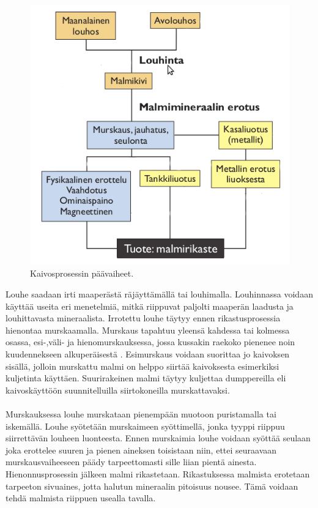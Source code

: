 \documentclass[finnish,12pt,a4paper,pdftex,elec,utf8]{aaltothesis}
\begin{document}
\begin{figure}[H]
	\begin{center}
	\includegraphics[scale=0.8]{Kaivosprosessi}
	\end{center}
	\caption{Kaivosprosessin päävaiheet.
		\cite{Kaivosprosessi}}
	\label{fig:Kaivosprosessi}
	
\end{figure}
\noindent
Louhe saadaan irti maaperästä räjäyttämällä tai louhimalla. Louhinnassa voidaan käyttää useita eri menetelmiä, mitkä riippuvat paljolti maaperän laadusta ja louhittavasta mineraalista. Irrotettu louhe täytyy ennen rikastusprosessia hienontaa murskaamalla. Murskaus tapahtuu yleensä kahdessa tai kolmessa osassa, esi-,väli- ja hienomurskauksessa, jossa kussakin raekoko pienenee noin kuudennekseen alkuperäisestä \cite[s. 198]{Hakapää}. Esimurskaus voidaan suorittaa jo kaivoksen sisällä, jolloin murskattu malmi on helppo siirtää kaivoksesta esimerkiksi kuljetinta käyttäen. Suurirakeinen malmi täytyy kuljettaa dumppereilla eli kaivoskäyttöön suunnitelluilla siirtokoneilla murskattavaksi. 
\\\\
Murskauksessa louhe murskataan pienempään muotoon puristamalla tai iskemällä. Louhe syötetään murskaimeen syöttimellä, jonka tyyppi riippuu siirrettävän louheen luonteesta. Ennen murskaimia louhe voidaan syöttää seulaan joka erottelee suuren ja pienen aineksen toisistaan niin, ettei seuraavaan murskausvaiheeseen päädy tarpeettomasti sille liian pientä ainesta. Hienonnusprosessin jälkeen malmi rikastetaan. Rikastuksessa malmista erotetaan tarpeeton sivuaines, jotta halutun mineraalin pitoisuus nousee. Tämä voidaan tehdä malmista riippuen usealla tavalla. \cite[s. 197-199]{Hakapää}
\end{document}
